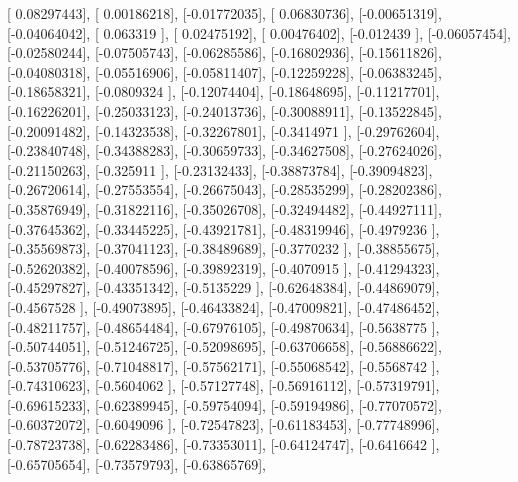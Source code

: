 \documentclass{article}
\begin{document}
       [ 0.08297443],
       [ 0.00186218],
       [-0.01772035],
       [ 0.06830736],
       [-0.00651319],
       [-0.04064042],
       [ 0.063319  ],
       [ 0.02475192],
       [ 0.00476402],
       [-0.012439  ],
       [-0.06057454],
       [-0.02580244],
       [-0.07505743],
       [-0.06285586],
       [-0.16802936],
       [-0.15611826],
       [-0.04080318],
       [-0.05516906],
       [-0.05811407],
       [-0.12259228],
       [-0.06383245],
       [-0.18658321],
       [-0.0809324 ],
       [-0.12074404],
       [-0.18648695],
       [-0.11217701],
       [-0.16226201],
       [-0.25033123],
       [-0.24013736],
       [-0.30088911],
       [-0.13522845],
       [-0.20091482],
       [-0.14323538],
       [-0.32267801],
       [-0.3414971 ],
       [-0.29762604],
       [-0.23840748],
       [-0.34388283],
       [-0.30659733],
       [-0.34627508],
       [-0.27624026],
       [-0.21150263],
       [-0.325911  ],
       [-0.23132433],
       [-0.38873784],
       [-0.39094823],
       [-0.26720614],
       [-0.27553554],
       [-0.26675043],
       [-0.28535299],
       [-0.28202386],
       [-0.35876949],
       [-0.31822116],
       [-0.35026708],
       [-0.32494482],
       [-0.44927111],
       [-0.37645362],
       [-0.33445225],
       [-0.43921781],
       [-0.48319946],
       [-0.4979236 ],
       [-0.35569873],
       [-0.37041123],
       [-0.38489689],
       [-0.3770232 ],
       [-0.38855675],
       [-0.52620382],
       [-0.40078596],
       [-0.39892319],
       [-0.4070915 ],
       [-0.41294323],
       [-0.45297827],
       [-0.43351342],
       [-0.5135229 ],
       [-0.62648384],
       [-0.44869079],
       [-0.4567528 ],
       [-0.49073895],
       [-0.46433824],
       [-0.47009821],
       [-0.47486452],
       [-0.48211757],
       [-0.48654484],
       [-0.67976105],
       [-0.49870634],
       [-0.5638775 ],
       [-0.50744051],
       [-0.51246725],
       [-0.52098695],
       [-0.63706658],
       [-0.56886622],
       [-0.53705776],
       [-0.71048817],
       [-0.57562171],
       [-0.55068542],
       [-0.5568742 ],
       [-0.74310623],
       [-0.5604062 ],
       [-0.57127748],
       [-0.56916112],
       [-0.57319791],
       [-0.69615233],
       [-0.62389945],
       [-0.59754094],
       [-0.59194986],
       [-0.77070572],
       [-0.60372072],
       [-0.6049096 ],
       [-0.72547823],
       [-0.61183453],
       [-0.77748996],
       [-0.78723738],
       [-0.62283486],
       [-0.73353011],
       [-0.64124747],
       [-0.6416642 ],
       [-0.65705654],
       [-0.73579793],
       [-0.63865769],
\end{document}
